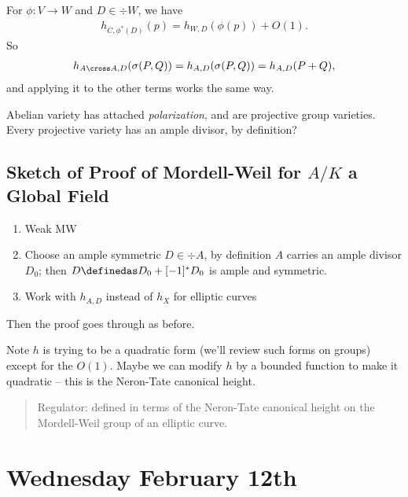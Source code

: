 For \(\phi: V \to W\) and \(D\in \div W\), we have
\begin{align*}
  h_{C, \phi^*(D)}(p) = h_{W, D}(\phi(p)) + O(1)
  .\end{align*} So
\begin{align*}
  h_{A\cross A, D}(\sigma(P, Q)) = h_{A, D}(\sigma(P, Q)) = h_{A, D}(P + Q)
  ,\end{align*} and applying it to the other terms works the same way.

Abelian variety has attached \emph{polarization}, and are projective
group varieties. Every projective variety has an ample divisor, by
definition?

\hypertarget{sketch-of-proof-of-mordell-weil-for-ak-a-global-field}{%
\subsection{\texorpdfstring{Sketch of Proof of Mordell-Weil for \(A/K\)
a Global
Field}{Sketch of Proof of Mordell-Weil for A/K a Global Field}}\label{sketch-of-proof-of-mordell-weil-for-ak-a-global-field}}

\begin{enumerate}
\def\labelenumi{\arabic{enumi}.}
\item
  Weak MW
\item
  Choose an ample symmetric \(D \in \div A\), by definition \(A\)
  carries an ample divisor \(D_0\); then
  \(D \definedas D_0 + [-1]^* D_0\) is ample and symmetric.
\item
  Work with \(h_{A, D}\) instead of \(h_X\) for elliptic curves
\end{enumerate}

Then the proof goes through as before.

Note \(h\) is trying to be a quadratic form (we'll review such forms on
groups) except for the \(O(1)\). Maybe we can modify \(h\) by a bounded
function to make it quadratic -- this is the Neron-Tate canonical
height.

\begin{quote}
Regulator: defined in terms of the Neron-Tate canonical height on the
Mordell-Weil group of an elliptic curve.
\end{quote}

\hypertarget{wednesday-february-12th}{%
\section{Wednesday February 12th}\label{wednesday-february-12th}}


